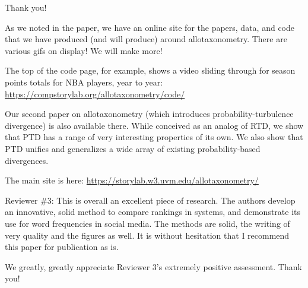 Thank you!

As we noted in the paper, we have an online site for the papers, data, and code that we have produced
(and will produce) around allotaxonometry. There are various gifs on display!
We will make more!

The top of the code page, for example, shows a video sliding through for
season points totals for NBA players, year to year:
\url{https://compstorylab.org/allotaxonometry/code/}

Our second paper on allotaxonometry (which introduces probability-turbulence divergence)
is also available there.
While conceived as an analog of RTD,
we show that PTD has a range of very interesting properties of its own.
We also show that PTD unifies and generalizes a wide array of existing probability-based
divergences.

The main site is here:
\url{https://storylab.w3.uvm.edu/allotaxonometry/}


\begin{reviewercomment}
  Reviewer \#3: This is overall an excellent piece of research. The authors develop an innovative, solid method to compare rankings in systems, and demonstrate its use for word frequencies in social media. The methods are solid, the writing of very quality and the figures as well. It is without hesitation that I recommend this paper for publication as is.
\end{reviewercomment}


We greatly, greatly appreciate Reviewer 3's extremely positive assessment. Thank you!

